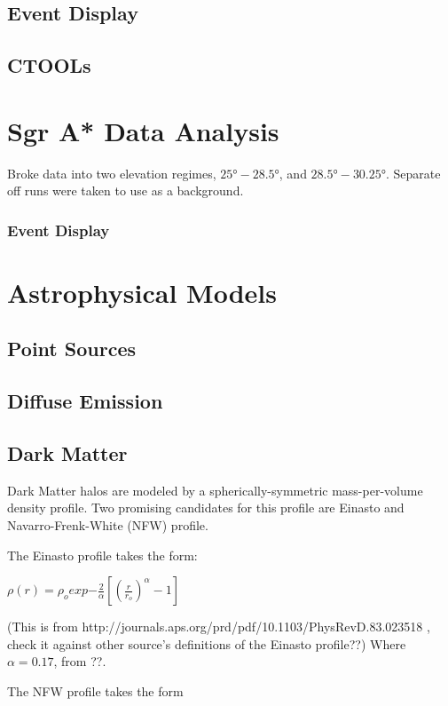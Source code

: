 \subsection{Event Display}
\subsection{CTOOLs}

\section{Sgr A* Data Analysis}
Broke data into two elevation regimes, $ \ang{25}-\ang{28.5} $, and $ \ang{28.5}-\ang{30.25} $.
Separate off runs were taken to use as a background.

  \subsubsection{Event Display}

\section{Astrophysical Models}

\subsection{Point Sources}

\subsection{Diffuse Emission}

\subsection{Dark Matter}
Dark Matter halos are modeled by a spherically-symmetric mass-per-volume density profile.
Two promising candidates for this profile are Einasto and Navarro-Frenk-White (NFW) profile.

The Einasto profile takes the form:

$ \rho \left( r \right) = \rho_{o} exp { - \frac{2}{\alpha} [ \left( \frac{r}{r_o} \right)^{\alpha} - 1 ] } $

(This is from http://journals.aps.org/prd/pdf/10.1103/PhysRevD.83.023518 , check it against other source's definitions of the Einasto profile??)
Where $\alpha = 0.17 $, from ??.


The NFW profile takes the form

